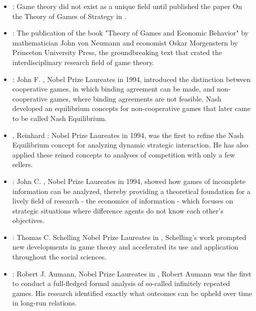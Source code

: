 \documentclass[runningheads]{llncs}
\begin{document}
\begin{itemize}
            \item \citeyear{vonneumann_1928_zur}: Game theory did not exist as a unique field until \citet{vonneumann_1928_zur} published the paper On the Theory of Games of Strategy in \citeyear{vonneumann_1928_zur}.\cite{vonneumann_1928_zur}
            \item \citeyear{vonneumann_1944_theory}: The publication of the book "Theory of Games and Economic Behavior" by mathematician John von Neumann and economist Oskar Morgenstern by Princeton University Press, the groundbreaking text that crated the interdisciplinary research field of game theory.\cite{vonneumann_1944_theory}
            \item \citeyear{nash_1951_noncooperative}: John F. \citeauthor{nash_1951_noncooperative}, Nobel Prize Laureates in 1994, introduced the distinction between cooperative games, in which binding agreement can be made, and non-cooperative games, where binding agreements are not feasible. Nash developed an equilibrium concepts for non-cooperative games that later came to be called Nash Equilibrium.\cite{nash_1951_noncooperative}
            \item \citeyear{selten_1965_spieltheoretische}, Reinhard \citeauthor{selten_1965_spieltheoretische}: Nobel Prize Laureates in 1994, was the first to refine the Nash Equilibrium concept for analyzing dynamic strategic interaction. He has also applied these reined concepts to analyses of competition with only a few sellers.\cite{selten_1965_spieltheoretische}
            \item \citeyear{harsanyi_1967_games}: John C. \citeauthor{harsanyi_1967_games}, Nobel Prize Laureates in 1994, showed how games of incomplete information can be analyzed, thereby providing a theoretical foundation for a lively field of research - the economics of information - which focuses on strategic situations where difference agents do not know each other's objectives.\cite{harsanyi_1967_games}
            \item \citeyear{rj_1985_what}: Thomas C. Schelling Nobel Prize Laureates in \citeyear{rj_1985_what}, Schelling's work prompted new developments in game theory and accelerated its use and application throughout the social sciences.\cite{rj_1985_what}
            \item \citeyear{rj_1985_what}: Robert J. Aumann, Nobel Prize Laureates in \citeyear{rj_1985_what}, Robert Aumann was the first to conduct a full-fledged formal analysis of so-called infinitely repeated games. His research identified exactly what outcomes can be upheld over time in long-run relations.\cite{rj_1985_what}

        \end{itemize}
\end{document}
